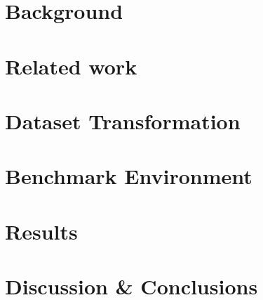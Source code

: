 \documentclass[a4paper,11pt,openany]{kth-mag}
\begin{document}
\chapter{Background}
    
\chapter{Related work}
     \label{related_work}
\chapter{Dataset Transformation}
    
\chapter{Benchmark Environment}
    
\chapter{Results}
    
\chapter{Discussion \& Conclusions}
    
    
\nocite{*}
\printbibliography

\addappheadtotoc



\end{document}
